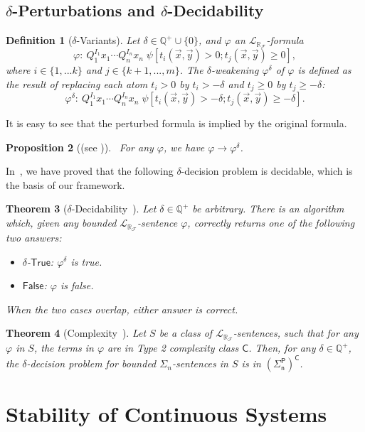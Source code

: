 \documentclass[12pt]{article}
\theoremstyle{plain}
\newtheorem{theorem}{Theorem}[section]
\newtheorem{proposition}[theorem]{Proposition}
\newtheorem{definition}[theorem]{Definition}
\theoremstyle{definition}
\newcommand{\lrf}{\mathcal{L}_{\mathbb{R}_{\mathcal{F}}}}
\begin{document}
\subsection{$\delta$-Perturbations and $\delta$-Decidability}
\begin{definition}[$\delta$-Variants]\label{variants}
Let $\delta\in \mathbb{Q}^+\cup\{0\}$, and $\varphi$ an
$\lrf$-formula
$$\varphi: \ Q_1^{I_1}x_1\cdots Q_n^{I_n}x_n\;\psi[t_i(\vec x, \vec y)>0;
t_j(\vec x, \vec
y)\geq 0],$$ where $i\in\{1,...k\}$ and $j\in\{k+1,...,m\}$. The {\em
$\delta$-weakening} $\varphi^{\delta}$ of $\varphi$ is
defined as the result of replacing each atom $t_i > 0$ by $t_i >
-\delta$ and $t_j \geq 0$ by $t_j \geq -\delta$:
$$\varphi^{\delta}:\ Q_1^{I_1}x_1\cdots Q_n^{I_n}x_n\;\psi[t_i(\vec x, \vec
y)>-\delta; t_j(\vec x,
\vec y)\geq -\delta].$$
\end{definition}
It is easy to see that the perturbed formula is implied by the original formula.
\begin{proposition}[(see \cite{DBLP:conf/lics/GaoAC12})]~\label{overap}
For any $\varphi$, we have $\varphi\rightarrow\varphi^{\delta}$.
\end{proposition}
In~\cite{DBLP:conf/lics/GaoAC12,DBLP:conf/cade/GaoAC12}, we have proved that the following $\delta$-decision problem is decidable, which is the basis of our framework.
\begin{theorem}[$\delta$-Decidability~\cite{DBLP:conf/lics/GaoAC12}]\label{delta-decide} Let $\delta\in\mathbb{Q}^+$ be
arbitrary. There is an algorithm which, given any bounded $\lrf$-sentence $\varphi$,
correctly returns one of the following two answers:
\begin{itemize}
\item $\delta$-$\mathsf{True}$: $\varphi^{\delta}$ is true.
\item $\mathsf{False}$: $\varphi$ is false.
\end{itemize}
When the two cases overlap, either answer is correct.
\end{theorem}
\begin{theorem}[Complexity~\cite{DBLP:conf/lics/GaoAC12}]\label{compmain}
Let $S$ be a class of $\lrf$-sentences, such that for any $\varphi$ in $S$, the terms in $\varphi$ are in Type 2 complexity class $\mathsf{C}$. Then, for any $\delta\in \mathbb{Q}^+$, the $\delta$-decision problem for bounded $\Sigma_n$-sentences in $S$ is in $\mathsf{(\Sigma_n^P)^C}$.
\end{theorem}

\section{Stability of Continuous Systems}
\end{document}

